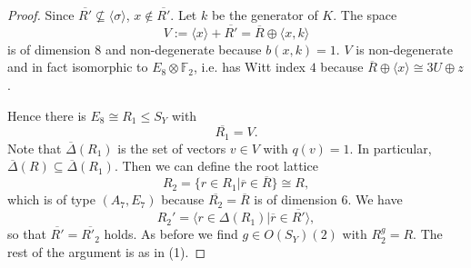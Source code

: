 \documentclass[a4paper]{amsart}
\theoremstyle{definition}
\theoremstyle{plain}
\newcommand{\FF}{\mathbb{F}}
\begin{document}
\begin{proof}
Since $\overline{R'}\not\subseteq \langle \sigma \rangle$, $x\not\in \overline{R'}$. 
Let $k$ be the generator of $K$. The space 
\[V:=\langle x\rangle + \overline{R'}=\overline{R}\oplus \langle x, k\rangle\] 
is of dimension $8$ and non-degenerate
because $b(x,k)=1$.
$V$ is non-degenerate and in fact isomorphic to $E_8\otimes \FF_2$, i.e. has Witt index $4$ because $\overline{R}\oplus \langle x\rangle\cong 3U\oplus z$.

Hence there is $E_8 \cong R_1\leq S_Y$ with 
\[\overline{R_1} = V.\]
Note that $\overline{\Delta}(R_1)$ is the set of vectors $v \in V$ with $q(v)=1$. 
In particular, $\overline{\Delta}(R)\subseteq \overline{\Delta}(R_1)$.
Then we can define the root lattice
\[R_2=\{ r \in R_1 | \overline{r} \in \overline{R}\}\cong R,\]
which is of type $(A_7,E_7)$ because $\overline{R_2}=\overline{R}$ is of dimension $6$. 
We have
\[R_2' = \langle r \in \Delta(R_1) | \overline{r} \in \overline{R'} \rangle,\]
so that $\overline{R'}=\overline{R'_2}$ holds. As before we find $g \in O(S_Y)(2)$ with $R_2^g=R$. The rest of the argument is as in (1).
\end{proof}
\end{document}
